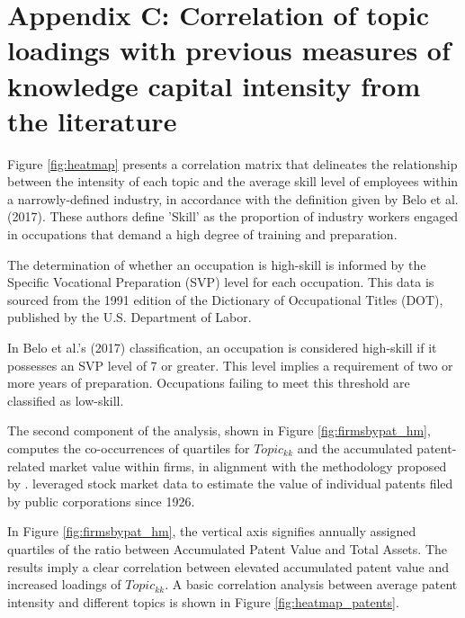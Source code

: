\documentclass[12pt, letterpaper]{article}
\begin{document}
\section*{Appendix C: Correlation of topic loadings with previous measures of knowledge capital intensity from the literature}

Figure \ref{fig:heatmap} presents a correlation matrix that delineates the relationship between the intensity of each topic and the average skill level of employees within a narrowly-defined industry, in accordance with the definition given by Belo et al. (2017). These authors define 'Skill' as the proportion of industry workers engaged in occupations that demand a high degree of training and preparation.

The determination of whether an occupation is high-skill is informed by the Specific Vocational Preparation (SVP) level for each occupation. This data is sourced from the 1991 edition of the Dictionary of Occupational Titles (DOT), published by the U.S. Department of Labor. 

In Belo et al.'s (2017) classification, an occupation is considered high-skill if it possesses an SVP level of 7 or greater. This level implies a requirement of two or more years of preparation. Occupations failing to meet this threshold are classified as low-skill.


The second component of the analysis, shown in Figure \ref{fig:firmsbypat_hm}, computes the co-occurrences of quartiles for $Topic_{kk}$ and the accumulated patent-related market value within firms, in alignment with the methodology proposed by \cite{Kogan2017-fx}. \cite{Kogan2017-fx} leveraged stock market data to estimate the value of individual patents filed by public corporations since 1926. 

 In Figure \ref{fig:firmsbypat_hm}, the vertical axis signifies annually assigned quartiles of the ratio between Accumulated Patent Value and Total Assets. The results imply a clear correlation between elevated accumulated patent value and increased loadings of $Topic_{kk}$. A basic correlation analysis between average patent intensity and different topics is shown in Figure \ref{fig:heatmap_patents}.

\end{document}
